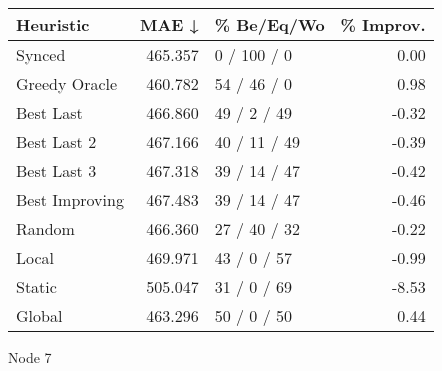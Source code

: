 \begin{tabular}{lrlr}
\toprule
\textbf{Heuristic} & \textbf{MAE ↓} & \textbf{\% Be/Eq/Wo} & \textbf{\% Improv.} \\
\midrule
            Synced &        465.357 &          0 / 100 / 0 &                0.00 \\
     Greedy Oracle &        460.782 &          54 / 46 / 0 &                0.98 \\
         Best Last &        466.860 &          49 / 2 / 49 &               -0.32 \\
       Best Last 2 &        467.166 &         40 / 11 / 49 &               -0.39 \\
       Best Last 3 &        467.318 &         39 / 14 / 47 &               -0.42 \\
    Best Improving &        467.483 &         39 / 14 / 47 &               -0.46 \\
            Random &        466.360 &         27 / 40 / 32 &               -0.22 \\
             Local &        469.971 &          43 / 0 / 57 &               -0.99 \\
            Static &        505.047 &          31 / 0 / 69 &               -8.53 \\
            Global &        463.296 &          50 / 0 / 50 &                0.44 \\
\bottomrule
\end{tabular}
\caption{Node 7}
\label{tab:non_lr05_le1_bs2_7}
